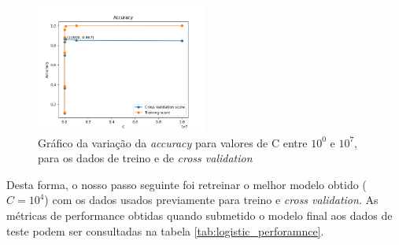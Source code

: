 \begin{figure}[t]
\begin{center}
\includegraphics[width=0.5\textwidth,keepaspectratio]{figures/accuracy_C.png}
\caption{Gráfico da variação da \textit{accuracy} para valores de C entre $10^{0}$ e $10^{7}$, para os dados de treino e de \textit{cross validation}}
\label{diagram:accuracy_c_logistic}
\centering
\end{center}
\end{figure}

Desta forma, o nosso passo seguinte foi retreinar o melhor modelo obtido ($C = 10^{4}$) com os dados usados previamente para treino e \textit{cross validation}. As métricas de performance obtidas quando submetido o modelo final aos dados de teste podem ser consultadas na tabela \ref{tab:logistic_perforamnce}.

